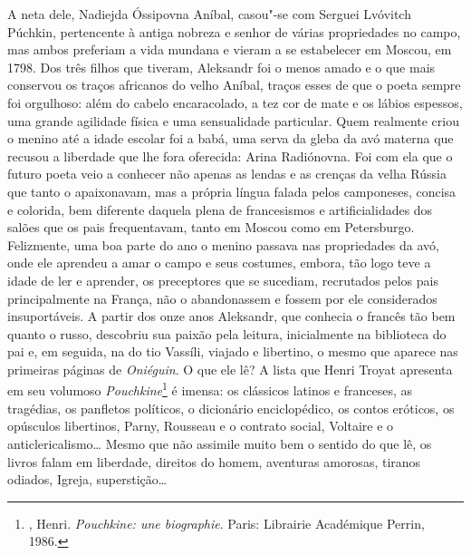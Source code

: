 A neta dele, Nadiejda Óssipovna Aníbal, casou"-se com Serguei Lvóvitch
Púchkin, pertencente à antiga nobreza e senhor de várias
propriedades no campo, mas ambos preferiam a vida mundana e vieram a se
estabelecer em Moscou, em 1798. Dos três filhos que tiveram, Aleksandr
foi o menos amado e o que mais conservou os traços africanos do velho
Aníbal, traços esses de que o poeta sempre foi orgulhoso: além do cabelo
encaracolado, a tez cor de mate e os lábios espessos, uma grande
agilidade física e uma sensualidade particular. Quem realmente criou o
menino até a idade escolar foi a babá, uma serva da gleba da avó
materna que recusou a liberdade que lhe fora oferecida: Arina
Radiónovna. Foi com ela que o futuro poeta veio a conhecer não apenas as
lendas e as crenças da velha Rússia que tanto o apaixonavam, mas a própria
língua falada pelos camponeses, concisa e colorida, bem diferente
daquela plena de francesismos e artificialidades dos salões que os pais
frequentavam, tanto em Moscou como em Petersburgo. Felizmente, uma boa
parte do ano o menino passava nas propriedades da avó, onde ele aprendeu
a amar o campo e seus costumes, embora, tão logo teve a idade de ler e
aprender, os preceptores que se sucediam, recrutados pelos pais
principalmente na França, não o abandonassem e fossem por ele
considerados insuportáveis. A partir dos onze anos Aleksandr, que
conhecia o francês tão bem quanto o russo, descobriu sua paixão pela
leitura, inicialmente na biblioteca do pai e, em seguida, na
do tio Vassíli, viajado e libertino, o mesmo que aparece nas
primeiras páginas de \emph{Oniéguin}. O que ele lê? A lista que
Henri Troyat apresenta em seu volumoso
\emph{Pouchkine}\footnote{, Henri.
\emph{Pouchkine: une biographie}. Paris: Librairie Académique Perrin,
1986.} é imensa: os clássicos latinos e franceses, as tragédias, os
panfletos políticos, o dicionário enciclopédico, os contos eróticos,
os opúsculos libertinos, Parny, Rousseau e o contrato social,
Voltaire e o anticlericalismo\ldots{} Mesmo que não assimile muito
bem o sentido do que lê, os livros falam em liberdade, direitos do
homem, aventuras amorosas, tiranos odiados, Igreja, superstição\ldots{}

